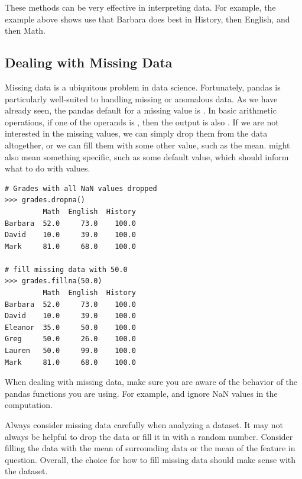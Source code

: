 These methods can be very effective in interpreting data.
For example, the  example above shows use that Barbara does best in History, then English, and then Math.

\subsection*{Dealing with Missing Data}

Missing data is a ubiquitous problem in data science.
Fortunately, pandas is particularly well-suited to handling missing or anomalous data.
As we have already seen, the pandas default for a missing value is .
In basic arithmetic operations, if one of the operands is , then the output is also .
If we are not interested in the missing values, we can simply drop them from the data altogether, or we can fill them with some other value, such as the mean.
 might also mean something specific, such as some default value, which should inform what to do with  values.

\begin{lstlisting}
# Grades with all NaN values dropped
>>> grades.dropna()
         Math  English  History
Barbara  52.0     73.0    100.0
David    10.0     39.0    100.0
Mark     81.0     68.0    100.0

# fill missing data with 50.0
>>> grades.fillna(50.0)
         Math  English  History
Barbara  52.0     73.0    100.0
David    10.0     39.0    100.0
Eleanor  35.0     50.0    100.0
Greg     50.0     26.0    100.0
Lauren   50.0     99.0    100.0
Mark     81.0     68.0    100.0
\end{lstlisting}

When dealing with missing data, make sure you are aware of the behavior of the pandas functions you are using.
For example,  and  ignore NaN values in the computation.

\begin{warn}
Always consider missing data carefully when analyzing a dataset.
It may not always be helpful to drop the data or fill it in with a random number.
Consider filling the data with the mean of surrounding data or the mean of the feature in question.
Overall, the choice for how to fill missing data should make sense with the dataset.
\end{warn}

